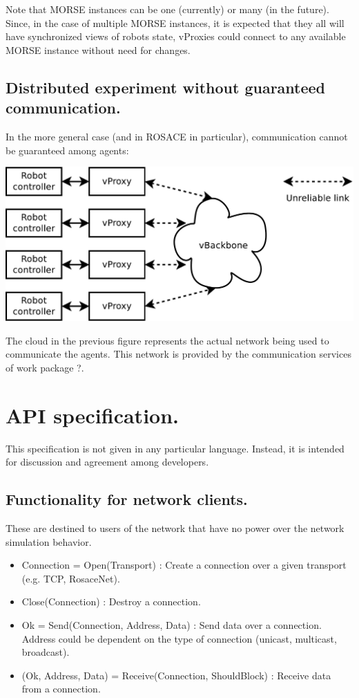 \documentclass[a4paper,11pt]{article}
\begin{document}
Note that MORSE instances can be one (currently) or many (in the future). Since, in the case of multiple MORSE instances, it is expected that they all will have synchronized views of robots state, vProxies could connect to any available MORSE instance without need for changes.

\subsection{Distributed experiment without guaranteed communication.}

In the more general case (and in ROSACE in particular), communication cannot be guaranteed among agents:

\begin{center}
\includegraphics[width=0.666\columnwidth]{figures/distrib}
\end{center}

The cloud in the previous figure represents the actual network being used to
communicate the agents. This network is provided by the communication services
of work package ?.

\section{API specification.}

This specification is not given in any particular language. Instead, it is
intended for discussion and agreement among developers.

\subsection{Functionality for network clients.}

These are destined to users of the network that have no power over the network
simulation behavior.

\begin{itemize}
    \item Connection = Open(Transport) : Create a connection over a given
transport (e.g. TCP, RosaceNet).
    \item Close(Connection) : Destroy a connection.
    \item Ok = Send(Connection, Address, Data) : Send data over a connection.
Address could be dependent on the type of connection (unicast, multicast,
broadcast).
    \item (Ok, Address, Data) = Receive(Connection, ShouldBlock) : Receive
data from a connection.
\end{itemize}
\end{document}
